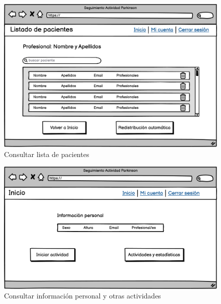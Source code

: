 \begin{figure}[h]
    \centering
    \includegraphics[width=1\textwidth]{img/UI_Wireframes/UI_CU-15_Consultar lista de pacientes.png}
    \caption{Consultar lista de pacientes}
    \label{fig:Consultar lista de pacientes}
\end{figure}

\begin{figure}[h]
    \centering
    \includegraphics[width=1\textwidth]{img/UI_Wireframes/UI_CU-17_Consultar info personal y otras actividades.png}
    \caption{Consultar información personal y otras actividades}
    \label{fig:Consultar info personal y otras actividades}
\end{figure}

